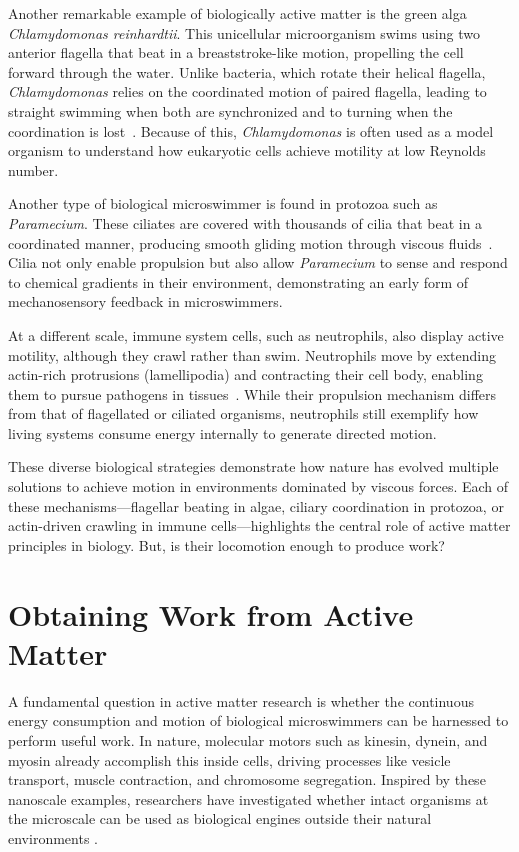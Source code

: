 Another remarkable example of biologically active matter is the green alga \textit{Chlamydomonas reinhardtii}. This unicellular microorganism swims using two anterior flagella that beat in a breaststroke-like motion, propelling the cell forward through the water. Unlike bacteria, which rotate their helical flagella, \textit{Chlamydomonas} relies on the coordinated motion of paired flagella, leading to straight swimming when both are synchronized and to turning when the coordination is lost~\cite{goldstein2015green}. Because of this, \textit{Chlamydomonas} is often used as a model organism to understand how eukaryotic cells achieve motility at low Reynolds number.

Another type of biological microswimmer is found in protozoa such as \textit{Paramecium}. These ciliates are covered with thousands of cilia that beat in a coordinated manner, producing smooth gliding motion through viscous fluids~\cite{zhang2015paramecia}. Cilia not only enable propulsion but also allow \textit{Paramecium} to sense and respond to chemical gradients in their environment, demonstrating an early form of mechanosensory feedback in microswimmers.

At a different scale, immune system cells, such as neutrophils, also display active motility, although they crawl rather than swim. Neutrophils move by extending actin-rich protrusions (lamellipodia) and contracting their cell body, enabling them to pursue pathogens in tissues~\cite{friedl2004collective}. While their propulsion mechanism differs from that of flagellated or ciliated organisms, neutrophils still exemplify how living systems consume energy internally to generate directed motion.

These diverse biological strategies demonstrate how nature has evolved multiple solutions to achieve motion in environments dominated by viscous forces. Each of these mechanisms—flagellar beating in algae, ciliary coordination in protozoa, or actin-driven crawling in immune cells—highlights the central role of active matter principles in biology. But, is their locomotion enough to produce work?

\section{Obtaining Work from Active Matter}

A fundamental question in active matter research is whether the continuous energy consumption and motion of biological microswimmers can be harnessed to perform useful work. In nature, molecular motors such as kinesin, dynein, and myosin already accomplish this inside cells, driving processes like vesicle transport, muscle contraction, and chromosome segregation. Inspired by these nanoscale examples, researchers have investigated whether intact organisms at the microscale can be used as biological engines outside their natural environments \cite{schliwa2003molecular}.

